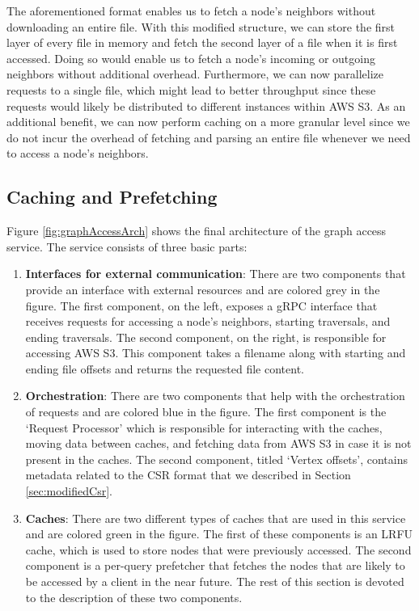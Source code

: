 \medskip
The aforementioned format enables us to fetch a node's neighbors
without downloading an entire file. With this modified structure, we can
store the first layer of every file in memory and fetch the second layer of a
file when it is first accessed. Doing so would enable us to fetch a
node's incoming or outgoing neighbors without additional overhead.
Furthermore, we can now parallelize requests to a single file, which might lead
to better throughput since these requests would likely be distributed to
different instances within AWS S3. As an additional benefit, we can now perform
caching on a more granular level since we do not incur the overhead of fetching
and parsing an entire file whenever we need to access a node's neighbors.

\subsection{Caching and Prefetching}\label{sec:accessCachePrefetching}
Figure \ref{fig:graphAccessArch} shows the final architecture of the graph
access service. The service consists of three basic parts:
\begin{enumerate}
    \item \textbf{Interfaces for external communication}: There are two 
        components that provide an interface with external resources and are
        colored grey in the figure. The first component, on the left,
        exposes a gRPC interface that receives requests for accessing a node's
        neighbors, starting traversals, and ending traversals. The second
        component, on the right, is responsible for accessing AWS S3. This component
        takes a filename along with starting and ending file offsets and returns
        the requested file content.
    \item \textbf{Orchestration}: There are two components that help with
        the orchestration of requests and are colored blue in the figure. The first
        component is the `Request Processor' which is responsible for
        interacting with the caches, moving data between caches, and fetching
        data from AWS S3 in case it is not present in the caches. The second
        component, titled `Vertex offsets', contains metadata related to the CSR
        format that we described in Section \ref{sec:modifiedCsr}.
    \item \textbf{Caches}: There are two different types of caches that are used
        in this service and are colored green in the figure. The first of these
        components is an LRFU cache, which is used to store nodes that were
        previously accessed. The second component is a per-query prefetcher
        that fetches the nodes that are likely to be accessed by a client in
        the near future. The rest of this section is devoted to the description
        of these two components.
\end{enumerate}
